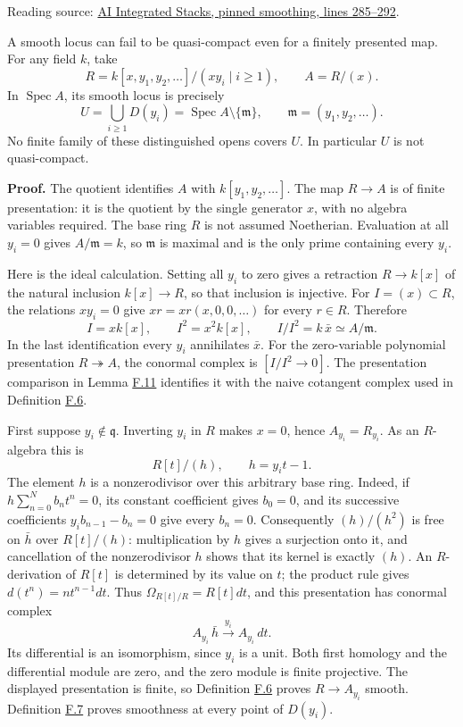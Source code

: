 \documentclass[11pt,a4paper,openany]{report}
\begin{document}
Reading source: \href{https://github.com/KokunoYumeto/unofficial-stacks-project-ai-drafts/blob/565b10e987aba5969b21145a0833f42d69f96790/smoothing.tex\#L285-L292}{AI Integrated Stacks, pinned smoothing, lines 285--292}.

A smooth locus can fail to be quasi-compact even for a finitely presented map. For any field \(k\), take \[R=k[x,y_1,y_2,\ldots]/(xy_i\mid i\geq1),\qquad A=R/(x).\] In \(\operatorname{Spec}A\), its smooth locus is precisely \[U=\bigcup_{i\geq1}D(y_i)
=\operatorname{Spec}A\setminus\{\mathfrak m\},\qquad
\mathfrak m=(y_1,y_2,\ldots).\] No finite family of these distinguished opens covers \(U\). In particular \(U\) is not quasi-compact.

\textbf{Proof.} The quotient identifies \(A\) with \(k[y_1,y_2,\ldots]\). The map \(R\to A\) is of finite presentation: it is the quotient by the single generator \(x\), with no algebra variables required. The base ring \(R\) is not assumed Noetherian. Evaluation at all \(y_i=0\) gives \(A/\mathfrak m=k\), so \(\mathfrak m\) is maximal and is the only prime containing every \(y_i\).

Here is the ideal calculation. Setting all \(y_i\) to zero gives a retraction \(R\to k[x]\) of the natural inclusion \(k[x]\to R\), so that inclusion is injective. For \(I=(x)\subset R\), the relations \(xy_i=0\) give \(xr=xr(x,0,0,\ldots)\) for every \(r\in R\). Therefore \[
I=xk[x],\qquad I^2=x^2k[x],\qquad I/I^2=k\,\bar x\simeq A/\mathfrak m.
\] In the last identification every \(y_i\) annihilates \(\bar x\). For the zero-variable polynomial presentation \(R\twoheadrightarrow A\), the conormal complex is \([I/I^2\to0]\). The presentation comparison in Lemma \hyperref[AG-RG-S05-algebra-lemma-NL-homotopy]{F.11} identifies it with the naive cotangent complex used in Definition \hyperref[AG-RG-S05-algebra-definition-smooth]{F.6}.

First suppose \(y_i\notin\mathfrak q\). Inverting \(y_i\) in \(R\) makes \(x=0\), hence \(A_{y_i}=R_{y_i}\). As an \(R\)-algebra this is \[
R[t]/(h),\qquad h=y_it-1.
\] The element \(h\) is a nonzerodivisor over this arbitrary base ring. Indeed, if \(h\sum_{n=0}^Nb_nt^n=0\), its constant coefficient gives \(b_0=0\), and its successive coefficients \(y_ib_{n-1}-b_n=0\) give every \(b_n=0\). Consequently \((h)/(h^2)\) is free on \(\bar h\) over \(R[t]/(h)\): multiplication by \(h\) gives a surjection onto it, and cancellation of the nonzerodivisor \(h\) shows that its kernel is exactly \((h)\). An \(R\)-derivation of \(R[t]\) is determined by its value on \(t\); the product rule gives \(d(t^n)=nt^{n-1}dt\). Thus \(\Omega_{R[t]/R}=R[t]dt\), and this presentation has conormal complex \[
A_{y_i}\,\bar h\xrightarrow{\ y_i\ }A_{y_i}\,dt.
\] Its differential is an isomorphism, since \(y_i\) is a unit. Both first homology and the differential module are zero, and the zero module is finite projective. The displayed presentation is finite, so Definition \hyperref[AG-RG-S05-algebra-definition-smooth]{F.6} proves \(R\to A_{y_i}\) smooth. Definition \hyperref[AG-RG-S05-algebra-definition-smooth-at-prime]{F.7} proves smoothness at every point of \(D(y_i)\).
\end{document}
